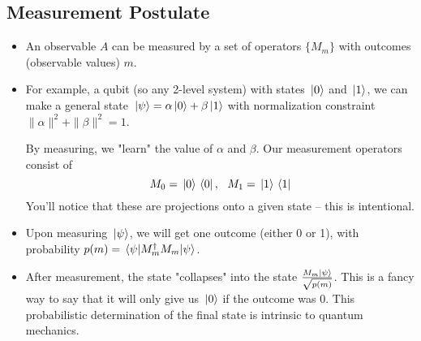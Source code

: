 \subsection{Measurement Postulate}
\begin{itemize}
	\item An observable \( A \) can be measured by a set of operators \( \{M_m\}  \) with outcomes (observable values)
		\( m \). 
	\item For example, a qubit (so any 2-level system) with states \( \ket*{0} \) and \( \ket*{1} \), we can make 
		a general state \(  \ket*{\psi} = \alpha\ket*{0} + \beta\ket*{1}\) with normalization 
		constraint \( \|\alpha\|^2 + \|\beta\|^2 = 1 \). 

		By measuring, we "learn" the value of \( \alpha \) and \( \beta \). Our measurement operators 
		consist of 
		\[
		M_0 = \ket*{0}\bra*{0}, \ \ M_1 = \ket*{1}\bra*{1}
		\] 
		You'll notice that these are projections onto a given state -- this is intentional. 
	\item Upon measuring \( \ket*{\psi} \), we will get one outcome (either 0 or 1), with probability
		\( p(m) = \mel*{\psi}{M_m^{\dagger}M_m}{\psi} \). 
	\item After measurement, the state "collapses" into the state \( \frac{M_m \ket*{\psi}}{\sqrt{p(m)} } \). This 
		is a fancy way to say that it will only give us \( \ket*{0} \) if the outcome was 0. This probabilistic 
		determination of the final state is intrinsic to quantum mechanics.   


\end{itemize}
